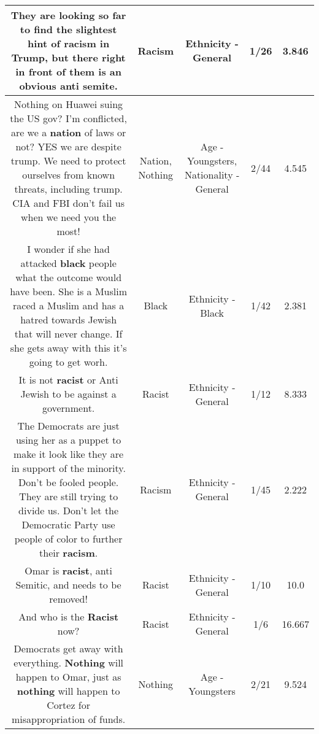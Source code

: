 \documentclass[11pt]{article}
\newlength\mylength
\begin{document}
\begin{center}
\begin{longtable}{|C{.65\mylength}|C{.30\mylength}|C{.12\mylength}|C{.12\mylength}|C{.12\mylength}|}
  \small They are looking so far to find the slightest hint of \textbf{racism} in Trump, but there right in front of them is an obvious anti semite.\normalsize   & Racism & Ethnicity - General & 1/26 & 3.846 \\  \hline
  \small Nothing on Huawei suing the US gov?  I'm conflicted, are we a \textbf{nation} of laws or not?  YES we are despite trump.  We need to protect ourselves from known threats, including trump.  CIA and FBI don't fail us when we need you the most!\normalsize   & Nation, Nothing & Age - Youngsters, Nationality - General & 2/44 & 4.545 \\  \hline
  \small I wonder if she had attacked \textbf{black} people what the outcome would have been. She is a Muslim raced a Muslim and has a hatred towards Jewish that will never change. If she gets away with this it's going to get worh.\normalsize   & Black & Ethnicity - Black & 1/42 & 2.381 \\  \hline
  \small It is not \textbf{racist} or Anti Jewish to be against a government.\normalsize   & Racist & Ethnicity - General & 1/12 & 8.333 \\  \hline
  \small The Democrats are just using her as a puppet to make it look like they are in support of the minority. Don't be fooled people. They are still trying to divide us. Don't let the Democratic Party use people of color to further their \textbf{racism}.\normalsize   & Racism & Ethnicity - General & 1/45 & 2.222 \\  \hline
  \small Omar is \textbf{racist}, anti Semitic, and needs to be removed!\normalsize   & Racist & Ethnicity - General & 1/10 & 10.0 \\  \hline
  \small And who is the \textbf{Racist} now?\normalsize   & Racist & Ethnicity - General & 1/6 & 16.667 \\  \hline
  \small Democrats get away with everything. \textbf{Nothing} will happen to Omar, just as \textbf{nothing} will happen to Cortez for misappropriation of funds.\normalsize   & Nothing & Age - Youngsters & 2/21 & 9.524 \\  \hline

\end{longtable}
\end{center}
\end{document}
